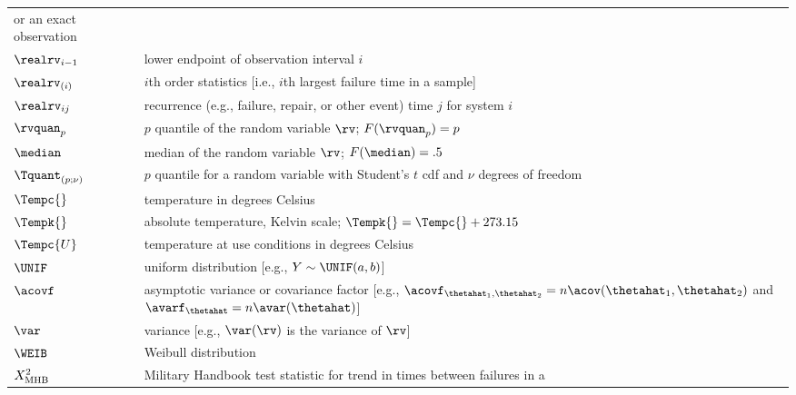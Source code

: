 \begin{supertabular}{p{0.9in}lp{4.0in}}
or an exact observation
\\
$\realrv_{i-1}$   & 
&lower endpoint of observation interval $i$
 \\[.3ex]
$\realrv_{(i)}$   & 
&$i$th order statistics [i.e., $i$th largest failure time in a sample]
  \\[.6ex]
$\realrv_{ij}$   & 
&
recurrence (e.g., failure, repair, or other event) time $j$  for system
$i$
  \\
$\rvquan_{p}$   & 
& $p$ quantile of the random variable  $\rv$;
$F(\rvquan_{p})=p$
   \\
$\median$ &
&median of the random variable $\rv$;
$F(\median)=.5$
   \\ 
$\Tquant_{(p;\nu)}$      & 
&$p$ quantile for a random variable with
Student's $t$ cdf and $\nu$ degrees of freedom
   \\
$\Tempc{}$   & 
&temperature in degrees Celsius
    \\ 
$\Tempk{}$   & 
&absolute temperature, Kelvin scale;
$\Tempk{}=\Tempc{}+273.15$
     \\ 
$\Tempc{U}$   & 
&temperature at use conditions in degrees Celsius
  \\ 
$\UNIF$  &
&uniform distribution [e.g.,
$Y \sim \UNIF(a, b)$]
  \\
$\acovf$  &
&asymptotic variance or covariance factor 
[e.g., $\acovf_{\thetahat_{1},\thetahat_{2}}=
         n\acov(\thetahat_{1},\thetahat_{2})$ and
$\avarf_{\thetahat}=n\avar(\thetahat)$]
  \\
$\var$     & 
&variance [e.g.,  $\var(\rv)$ is the variance
of $\rv$]
   \\
${\WEIB}$ &
&Weibull distribution
  \\
$X^{2}_{\rm MHB}$    & 
& Military Handbook
test statistic for trend in times between failures in a

\end{supertabular}

